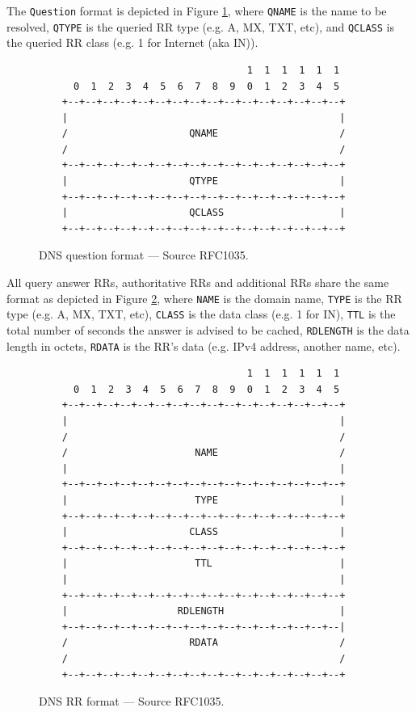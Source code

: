 \documentclass[pdftex,12pt,a4paper]{article}
\begin{document}
            The \texttt{Question} format is depicted in Figure
            \ref{fig:question}, where \texttt{QNAME} is the name to be
            resolved, \texttt{QTYPE} is the queried RR type (e.g. A, MX, TXT,
            etc), and \texttt{QCLASS} is the queried RR class (e.g. 1 for Internet
            (aka IN)).
            \begin{figure}[!htb]
                \centering
            \begin{verbatim}                                    1  1  1  1  1  1
      0  1  2  3  4  5  6  7  8  9  0  1  2  3  4  5
    +--+--+--+--+--+--+--+--+--+--+--+--+--+--+--+--+
    |                                               |
    /                     QNAME                     /
    /                                               /
    +--+--+--+--+--+--+--+--+--+--+--+--+--+--+--+--+
    |                     QTYPE                     |
    +--+--+--+--+--+--+--+--+--+--+--+--+--+--+--+--+
    |                     QCLASS                    |
    +--+--+--+--+--+--+--+--+--+--+--+--+--+--+--+--+\end{verbatim}
                \caption{DNS question format --- Source RFC1035.}
                \label{fig:question}
            \end{figure}


            All query answer RRs, authoritative RRs and additional RRs share
            the same format as depicted in Figure \ref{fig:rr}, where
            \texttt{NAME} is the domain name, \texttt{TYPE} is the RR type
            (e.g. A, MX, TXT, etc), \texttt{CLASS} is the data class (e.g. 1
            for IN), \texttt{TTL} is the total number of seconds the answer is
            advised to be cached, \texttt{RDLENGTH} is the data length in
            octets, \texttt{RDATA} is the RR's data (e.g. IPv4 address, another
            name, etc).
            \begin{figure}[!htb]
                \centering
            \begin{verbatim}                                    1  1  1  1  1  1
      0  1  2  3  4  5  6  7  8  9  0  1  2  3  4  5
    +--+--+--+--+--+--+--+--+--+--+--+--+--+--+--+--+
    |                                               |
    /                                               /
    /                      NAME                     /
    |                                               |
    +--+--+--+--+--+--+--+--+--+--+--+--+--+--+--+--+
    |                      TYPE                     |
    +--+--+--+--+--+--+--+--+--+--+--+--+--+--+--+--+
    |                     CLASS                     |
    +--+--+--+--+--+--+--+--+--+--+--+--+--+--+--+--+
    |                      TTL                      |
    |                                               |
    +--+--+--+--+--+--+--+--+--+--+--+--+--+--+--+--+
    |                   RDLENGTH                    |
    +--+--+--+--+--+--+--+--+--+--+--+--+--+--+--+--|
    /                     RDATA                     /
    /                                               /
    +--+--+--+--+--+--+--+--+--+--+--+--+--+--+--+--+\end{verbatim}
                \caption{DNS RR format --- Source RFC1035.}
                \label{fig:rr}
            \end{figure}
\end{document}
